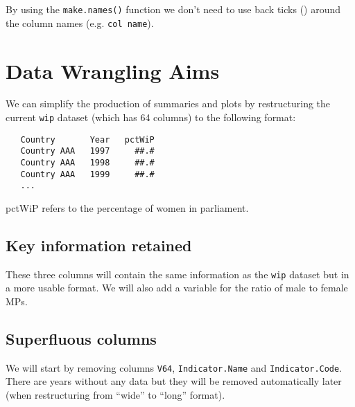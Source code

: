 \documentclass[a4paper,9pt,twocolumn,twoside,printwatermark=true]{pinp}
\begin{document}
By using the \texttt{make.names()} function we don't need to use back
ticks (\texttt{\textasciigrave{}}) around the column names (e.g.
\texttt{\textasciigrave{}col\ name\textasciigrave{}}).

\begin{Shaded}
\begin{Highlighting}[]
\StringTok{ }\NormalTok{(}
\NormalTok{(}
\NormalTok{(}
\end{Highlighting}
\end{Shaded}

\section{Data Wrangling Aims}\label{data-wrangling-aims}

We can simplify the production of summaries and plots by restructuring
the current \texttt{wip} dataset (which has 64 columns) to the following
format:

\begin{verbatim}
   Country       Year   pctWiP
   Country AAA   1997     ##.#
   Country AAA   1998     ##.#
   Country AAA   1999     ##.#
   ...
\end{verbatim}

pctWiP refers to the percentage of women in parliament.

\subsection{Key information retained}\label{key-information-retained}

These three columns will contain the same information as the
\texttt{wip} dataset but in a more usable format. We will also add a
variable for the ratio of male to female MPs.

\subsection{Superfluous columns}\label{superfluous-columns}

We will start by removing columns \texttt{V64}, \texttt{Indicator.Name}
and \texttt{Indicator.Code}. There are years without any data but they
will be removed automatically later (when restructuring from ``wide'' to
``long'' format).
\end{document}
